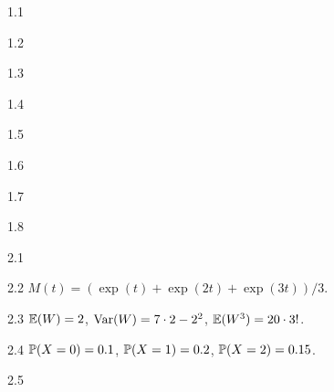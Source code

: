 \protect \hypertarget {soln:1.1}{}
\begin{solution}{{1.1}}

\end{solution}
\protect \hypertarget {soln:1.2}{}
\begin{solution}{{1.2}}

  
\end{solution}
\protect \hypertarget {soln:1.3}{}
\begin{solution}{{1.3}}

  
\end{solution}
\protect \hypertarget {soln:1.4}{}
\begin{solution}{{1.4}}
  
\end{solution}
\protect \hypertarget {soln:1.5}{}
\begin{solution}{{1.5}}

  
\end{solution}
\protect \hypertarget {soln:1.6}{}
\begin{solution}{{1.6}}

  
\end{solution}
\protect \hypertarget {soln:1.7}{}
\begin{solution}{{1.7}}

  
\end{solution}
\protect \hypertarget {soln:1.8}{}
\begin{solution}{{1.8}}

  
\end{solution}
\protect \hypertarget {soln:2.1}{}
\begin{solution}{{2.1}}

  
\end{solution}
\protect \hypertarget {soln:2.2}{}
\begin{solution}{{2.2}}
  $M(t) = (\exp(t) + \exp(2t) + \exp(3t))/3$.
  
\end{solution}
\protect \hypertarget {soln:2.3}{}
\begin{solution}{{2.3}}
  $\E(W) = 2$, $\Var(W) = 7\cdot 2 - 2^2$, $\E(W^3) = 20 \cdot 3!$.
  
\end{solution}
\protect \hypertarget {soln:2.4}{}
\begin{solution}{{2.4}}
  $\P(X = 0) = 0.1$, $\P(X = 1) = 0.2$, $\P(X = 2) = 0.15$.
  
\end{solution}
\protect \hypertarget {soln:2.5}{}
\begin{solution}{{2.5}}

  
\end{solution}
